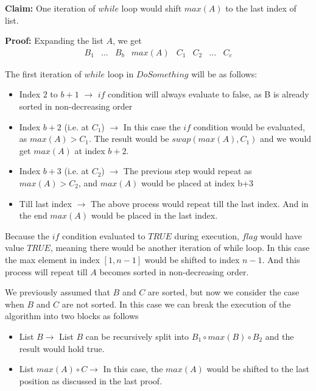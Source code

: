 \documentclass[12pt,a4paper]{article}
\begin{document}
\textbf{Claim:} One iteration of $while$ loop would shift $max(A)$ to the last index of list.

\textbf{Proof:} Expanding the list $A$, we get
\begin{equation*}
    \begin{matrix}
        B_1 & \hdots & B_b & max(A) & C_1 & C_2 & \hdots & C_c
    \end{matrix}
\end{equation*}

The first iteration of $while$ loop in $DoSomething$ will be as follows:
\begin{itemize}
    \item Index $2$ to $b+1$ $\rightarrow$ $if$ condition will always evaluate to false, as B is already sorted in non-decreasing order
    \item Index $b+2$ (i.e. at $C_1$) $\rightarrow$ In this case the $if$ condition would be evaluated, as $max(A) > C_1$. The result would be $swap(max(A), C_1)$ and we would get $max(A)$ at index $b+2$.
    \item Index $b+3$ (i.e. at $C_2$) $\rightarrow$ The previous step would repeat as $max(A) > C_2$, and $max(A)$ would be placed at index b+3
    \item Till last index $\rightarrow$ The above process would repeat till the last index. And in the end $max(A)$ would be placed in the last index.
\end{itemize}

Because the $if$ condition evaluated to $TRUE$ during execution, $flag$ would have value $TRUE$, meaning there would be another iteration of while loop. In this case the max element in index $[1, n-1]$ would be shifted to index $n-1$. And this process will repeat till $A$ becomes sorted in non-decreasing order.

We previously assumed that $B$ and $C$ are sorted, but now we consider the case when $B$ and $C$ are not sorted. In this case we can break the execution of the algorithm into two blocks as follows
\begin{itemize}
    \item List $B \rightarrow$ List $B$ can be recursively split into $B_1 \circ max(B) \circ B_2$ and the result would hold true.
    \item List $max(A) \circ C \rightarrow$ In this case, the $max(A)$ would be shifted to the last position as discussed in the last proof.
\end{itemize}
\end{document}
